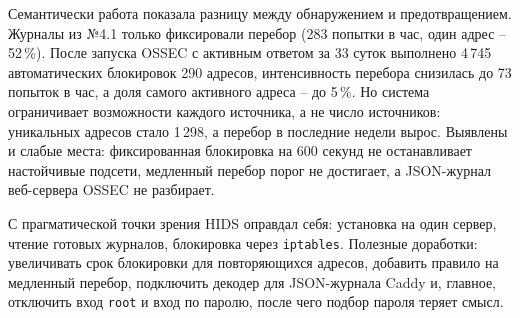 
Семантически работа показала разницу между обнаружением и
предотвращением. Журналы из №4.1 только фиксировали перебор (283 попытки в
час, один адрес -- 52\,\%). После запуска OSSEC с активным ответом за
33 суток выполнено 4\,745 автоматических блокировок 290 адресов,
интенсивность перебора снизилась до 73 попыток в час, а доля самого
активного адреса -- до 5\,\%. Но система ограничивает возможности каждого
источника, а не число источников: уникальных адресов стало 1\,298, а
перебор в последние недели вырос. Выявлены и слабые места: фиксированная
блокировка на 600 секунд не останавливает настойчивые подсети, медленный
перебор порог не достигает, а JSON-журнал веб-сервера OSSEC не разбирает.

С прагматической точки зрения HIDS оправдал себя: установка на один
сервер, чтение готовых журналов, блокировка через \texttt{iptables}.
Полезные доработки: увеличивать срок блокировки для повторяющихся
адресов, добавить правило на медленный перебор, подключить декодер для
JSON-журнала Caddy и, главное, отключить вход \texttt{root} и вход по
паролю, после чего подбор пароля теряет смысл.
